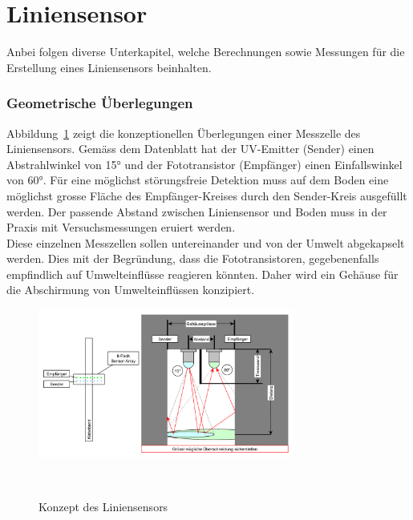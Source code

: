 \documentclass[main.tex]{subfiles} %
\begin{document}

\section{Liniensensor}
\label{anhang:Liniensensor}
Anbei folgen diverse Unterkapitel, welche Berechnungen sowie Messungen für die Erstellung eines Liniensensors beinhalten.

\subsubsection*{Geometrische Überlegungen}
Abbildung~\ref{fig:Konzept_graphml} zeigt die konzeptionellen Überlegungen einer Messzelle des
Liniensensors. Gemäss dem Datenblatt hat der UV-Emitter (Sender) einen Abstrahlwinkel von 15° und der
Fototransistor (Empfänger) einen Einfallswinkel von 60°. Für eine möglichst störungsfreie Detektion muss auf dem Boden
eine möglichst grosse Fläche des Empfänger-Kreises durch den Sender-Kreis ausgefüllt werden. Der passende
Abstand zwischen Liniensensor und Boden muss in der Praxis mit Versuchsmessungen eruiert werden.\\
Diese einzelnen Messzellen sollen untereinander und von der Umwelt abgekapselt werden. Dies
mit der Begründung, dass die Fototransistoren, gegebenenfalls empfindlich auf
Umwelteinflüsse reagieren könnten. Daher wird ein Gehäuse für die Abschirmung von Umwelteinflüssen
konzipiert.

\begin{figure}[H]
    \centering
    \includegraphics[width=0.75\textwidth]{./fig_Liniensensor/Konzept.pdf}
    \caption{Konzept des Liniensensors}~\label{fig:Konzept_graphml}
\end{figure}

\end{document}
